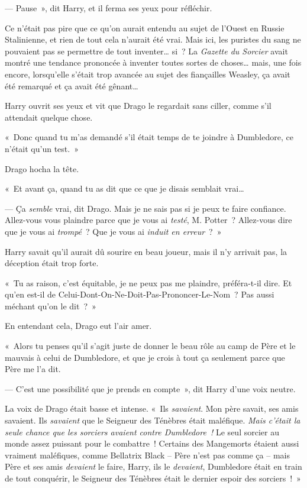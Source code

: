 --- Pause~», dit Harry, et il ferma ses yeux pour réfléchir.

Ce n'était pas pire que ce qu'on aurait entendu au sujet de l'Ouest en Russie Stalinienne, et rien de tout cela n'aurait été vrai. Mais ici, les puristes du sang ne pouvaient pas se permettre de tout inventer… si~? La \emph{Gazette du Sorcier} avait montré une tendance prononcée à inventer toutes sortes de choses… mais, une fois encore, lorsqu'elle s'était trop avancée au sujet des fiançailles Weasley, ça avait été remarqué et ça avait été gênant…

Harry ouvrit ses yeux et vit que Drago le regardait sans ciller, comme s'il attendait quelque chose.

«~Donc quand tu m'as demandé s'il était temps de te joindre à Dumbledore, ce n'était qu'un test.~»

Drago hocha la tête.

«~Et avant ça, quand tu as dit que ce que je disais semblait vrai…

--- Ça \emph{semble} vrai, dit Drago. Mais je ne sais pas si je peux te faire confiance. Allez-vous vous plaindre parce que je vous ai \emph{testé}, M. Potter~? Allez-vous dire que je vous ai \emph{trompé}~? Que je vous ai \emph{induit en erreur}~?~»

Harry savait qu'il aurait dû sourire en beau joueur, mais il n'y arrivait pas, la déception était trop forte.

«~Tu as raison, c'est équitable, je ne peux pas me plaindre, préféra-t-il dire. Et qu'en est-il de Celui-Dont-On-Ne-Doit-Pas-Prononcer-Le-Nom~? Pas aussi méchant qu'on le dit~?~»

En entendant cela, Drago eut l'air amer.

«~Alors tu penses qu'il s'agit juste de donner le beau rôle au camp de Père et le mauvais à celui de Dumbledore, et que je crois à tout ça seulement parce que Père me l'a dit.

--- C'est une possibilité que je prends en compte~», dit Harry d'une voix neutre.

La voix de Drago était basse et intense. «~Ils \emph{savaient}. Mon père savait, ses amis savaient. Ils \emph{savaient} que le Seigneur des Ténèbres était maléfique. \emph{Mais c'était la seule chance que les sorciers avaient contre Dumbledore~!} Le seul sorcier au monde assez puissant pour le combattre~! Certains des Mangemorts étaient aussi vraiment maléfiques, comme Bellatrix Black -- Père n'est pas comme ça -- mais Père et ses amis \emph{devaient} le faire, Harry, ils le \emph{devaient}, Dumbledore était en train de tout conquérir, le Seigneur des Ténèbres était le dernier espoir des sorciers~!~»


